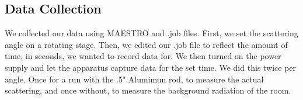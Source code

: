 \documentclass[10pt,letterpaper,onecolumn]{article}
\begin{document}
\subsection{Data Collection}
We collected our data using MAESTRO and .job files. First, we set the scattering angle on a rotating stage. Then, we edited our .job file to reflect the amount of time, in seconds, we wanted to record data for. We then turned on the power supply and let the apparatus capture data for the set time. We did this twice per angle. Once for a run with the .5" Alumimun rod, to measure the actual scattering, and once without, to measure the background radiation of the room.
 
 
\end{document}

